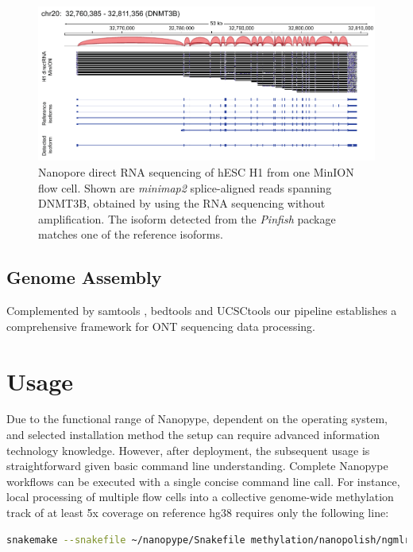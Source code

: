 \begin{figure}[h]
	\centering
	\includegraphics[width=1.0\textwidth]{figures/nanopype/rna_isoforms.pdf}
	\captionsetup{format=plain}
	\caption[Nanopore direct RNA sequencing]{Nanopore direct RNA sequencing of hESC H1 from one MinION flow cell. Shown are \textit{minimap2} splice-aligned reads spanning DNMT3B, obtained by using the RNA sequencing without amplification. The isoform detected from the \textit{Pinfish} package matches one of the reference isoforms.}
	\label{fig:nanopype:rna_isoforms}
\end{figure}


\subsection{Genome Assembly}
\label{subsec:nanopype:assembly}



Complemented by samtools \cite{Li2009}, bedtools \cite{Quinlan2010} and UCSCtools \cite{Kent2010} our pipeline establishes a comprehensive framework for ONT sequencing data processing.




\section{Usage}
\label{sec:nanopype:usage}
Due to the functional range of Nanopype, dependent on the operating system, and selected installation method the setup can require advanced information technology knowledge. However, after deployment, the subsequent usage is straightforward given basic command line understanding. Complete Nanopype workflows can be executed with a single concise command line call. For instance, local processing of multiple flow cells into a collective genome-wide methylation track of at least 5x coverage on reference hg38 requires only the following line:

\begin{lstlisting}[language=sh, caption=Snakemake example]
snakemake --snakefile ~/nanopype/Snakefile methylation/nanopolish/ngmlr/guppy/Hues8.5x.hg38.bw
\end{lstlisting}

